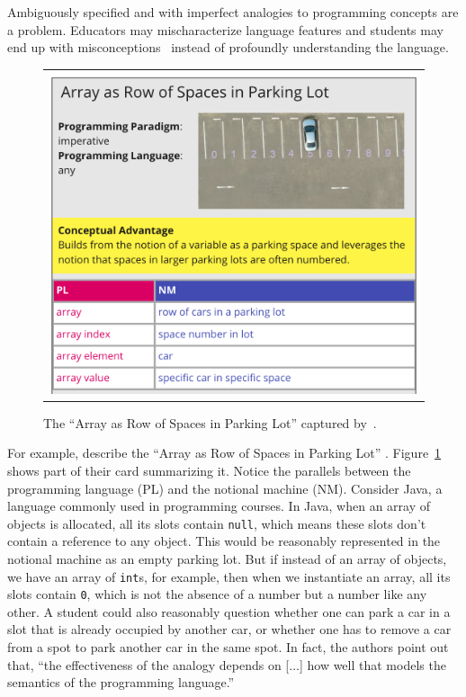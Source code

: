 Ambiguously specified \nms{}
and
\nms{} with imperfect analogies to programming concepts
are a problem.
Educators may mischaracterize language features and
students may end up with misconceptions~\citep{chiodiniCuratedInventoryProgramming2021} instead of profoundly understanding the language.

\begin{figure}
    \centering
    \begin{tabular}{c}
        \includegraphics[width=.50\textwidth]{images/nm-definition-cards/nm-array-as-row-of-spaces-in-parking-lot-cut}
    \end{tabular}
     \caption{The ``Array as Row of Spaces in Parking Lot'' \nm{} captured by~\citet{fincherNotionalMachinesComputing2020}.}
    \label{fig:parkingSpaces}
\end{figure}

For example,
\citet{fincherNotionalMachinesComputing2020} describe the
``Array as Row of Spaces in Parking Lot'' \nm{}.
Figure~\ref{fig:parkingSpaces} shows part of their card summarizing it.
Notice the parallels between the programming language (PL) and the notional machine (NM).
Consider Java, a language commonly used in programming courses.
In Java,
when an array of objects is allocated,
all its slots contain
\texttt{null},
which means these slots don't contain a reference to any object.
This would be reasonably represented in the notional machine as an empty parking lot.
But if instead of an array of objects, we have an array of
\texttt{int}s,
for example,
then when we instantiate an array,
all its slots contain
\texttt{0},
which is not the absence of a number but a number like any other.
%
A student could also reasonably question whether
one can park a car in a slot that is already occupied by another car,
or whether
one has to remove a car from a spot to park another car in the same spot.
%
In fact, the authors point out that,
``the effectiveness of the analogy depends on
[...]
how well that models the semantics of the programming language.''


